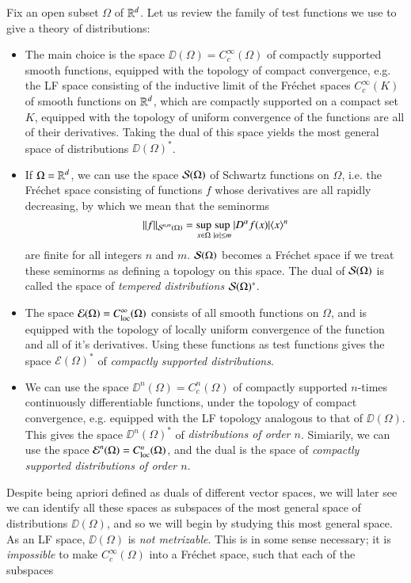 Fix an open subset $\Omega$ of $\operatorname{\mathbb{R}}^d$. Let us review the family of test functions we use to give a theory of distributions:
%
\begin{itemize}
    \item The main choice is the space $\DD(\Omega) = C_c^\infty(\Omega)$ of compactly supported smooth functions, equipped with the topology of compact convergence, e.g. the LF space consisting of the inductive limit of the Fr\'{e}chet spaces $C^\infty_c(K)$ of smooth functions on $\operatorname{\mathbb{R}}^d$, which are compactly supported on a compact set $K$, equipped with the topology of uniform convergence of the functions are all of their derivatives. Taking the dual of this space yields the most general space of distributions $\DD(\Omega)^*$.

    \item If $\Omega = \operatorname{\mathbb{R}}^d$, we can use the space $\operatorname{\mathcal{S}}(\Omega)$ of Schwartz functions on $\Omega$, i.e. the Fr\'{e}chet space consisting of functions $f$ whose derivatives are all rapidly decreasing, by which we mean that the seminorms
    \[ \| f \|_{\operatorname{\mathcal{S}}^{n,m}(\Omega)} = \sup_{x \in \Omega} \sup_{|\alpha| \leq m} |D^\alpha f(x)| \langle x \rangle^n \]
    are finite for all integers $n$ and $m$. $\operatorname{\mathcal{S}}(\Omega)$ becomes a Fr\'{e}chet space if we treat these seminorms as defining a topology on this space. The dual of $\operatorname{\mathcal{S}}(\Omega)$ is called the space of \emph{tempered distributions} $\operatorname{\mathcal{S}}(\Omega)^*$.

    \item The space $\mathcal{E}(\Omega) = C^\infty_{\text{loc}}(\Omega)$ consists of all smooth functions on $\Omega$, and is equipped with the topology of locally uniform convergence of the function and all of it's derivatives. Using these functions as test functions gives the space $\mathcal{E}(\Omega)^*$ of \emph{compactly supported distributions}.

    \item We can use the space $\DD^n(\Omega) = C_c^n(\Omega)$ of compactly supported $n$-times continuously differentiable functions, under the topology of compact convergence, e.g. equipped with the LF topology analogous to that of $\DD(\Omega)$. This gives the space $\DD^n(\Omega)^*$ of \emph{distributions of order $n$}. Simiarily, we can use the space $\operatorname{\mathcal{E}}^n(\Omega) = C^n_{\text{loc}}(\Omega)$, and the dual is the space of \emph{compactly supported distributions of order $n$}.
\end{itemize}
%
Despite being apriori defined as duals of different vector spaces, we will later see we can identify all these spaces as subspaces of the most general space of distributions $\DD(\Omega)$, and so we will begin by studying this most general space. As an LF space, $\DD(\Omega)$ is \emph{not metrizable}. This is in some sense necessary; it is \emph{impossible} to make $C_c^\infty(\Omega)$ into a Fr\'{e}chet space, such that each of the subspaces

